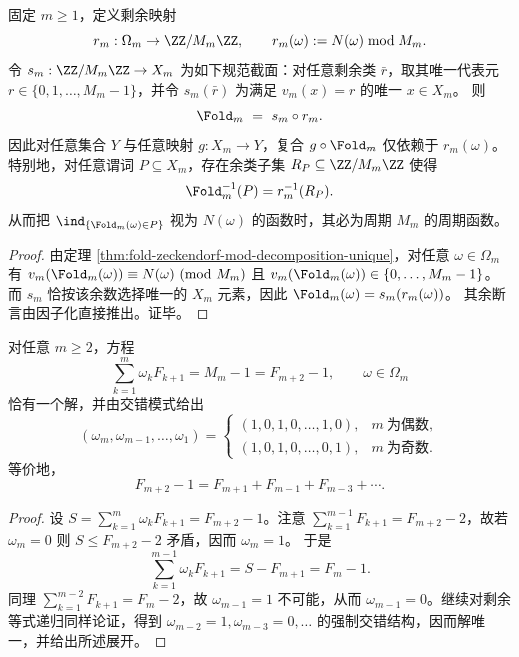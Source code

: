 \begin{corollary}[模余类刚性与有限分辨率谓词的周期性]\label{cor:fold-mod-rigidity-periodic-predicates}
固定 $m\ge 1$，定义剩余映射
\[
r_m:\Omega_m\to \ZZ/M_m\ZZ,\qquad r_m(\omega):=N(\omega)\bmod M_m.
\]
令 \(s_m:\ZZ/M_m\ZZ\to X_m\) 为如下规范截面：对任意剩余类 \(\bar r\)，取其唯一代表元 \(r\in\{0,1,\dots,M_m-1\}\)，并令 \(s_m(\bar r)\) 为满足 \(v_m(x)=r\) 的唯一 \(x\in X_m\)。
则
\[
\Fold_m\ =\ s_m\circ r_m.
\]
因此对任意集合 \(Y\) 与任意映射 \(g:X_m\to Y\)，复合 \(g\circ \Fold_m\) 仅依赖于 \(r_m(\omega)\)。
特别地，对任意谓词 \(P\subseteq X_m\)，存在余类子集 \(R_P\subseteq \ZZ/M_m\ZZ\) 使得
\[
\Fold_m^{-1}(P)=r_m^{-1}(R_P).
\]
从而把 \(\ind_{\{\Fold_m(\omega)\in P\}}\) 视为 \(N(\omega)\) 的函数时，其必为周期 \(M_m\) 的周期函数。
\end{corollary}

\begin{proof}
由定理 \ref{thm:fold-zeckendorf-mod-decomposition-unique}，对任意 \(\omega\in\Omega_m\) 有
\(
v_m(\Fold_m(\omega))\equiv N(\omega)\ (\mathrm{mod}\ M_m)
\)
且 \(v_m(\Fold_m(\omega))\in\{0,\dots,M_m-1\}\)。
而 \(s_m\) 恰按该余数选择唯一的 \(X_m\) 元素，因此 \(\Fold_m(\omega)=s_m(r_m(\omega))\)。
其余断言由因子化直接推出。证毕。
\end{proof}

\begin{proposition}[端点 $M_m-1$ 的子集和表示唯一性]\label{prop:fold-endpoint-Mm-minus-one-unique}
对任意 $m\ge 2$，方程
\[
\sum_{k=1}^{m}\omega_kF_{k+1}=M_m-1=F_{m+2}-1,\qquad \omega\in\Omega_m
\]
恰有一个解，并由交错模式给出
\[
(\omega_m,\omega_{m-1},\dots,\omega_1)=
\begin{cases}
(1,0,1,0,\dots,1,0), & m\ \text{为偶数},\\
(1,0,1,0,\dots,0,1), & m\ \text{为奇数}.
\end{cases}
\]
等价地，
\[
F_{m+2}-1=F_{m+1}+F_{m-1}+F_{m-3}+\cdots.
\]
\end{proposition}

\begin{proof}
设 $S=\sum_{k=1}^{m}\omega_kF_{k+1}=F_{m+2}-1$。注意 $\sum_{k=1}^{m-1}F_{k+1}=F_{m+2}-2$，故若 $\omega_m=0$ 则 $S\le F_{m+2}-2$ 矛盾，因而 $\omega_m=1$。
于是
\[
\sum_{k=1}^{m-1}\omega_kF_{k+1}=S-F_{m+1}=F_m-1.
\]
同理 $\sum_{k=1}^{m-2}F_{k+1}=F_m-2$，故 $\omega_{m-1}=1$ 不可能，从而 $\omega_{m-1}=0$。继续对剩余等式递归同样论证，得到 $\omega_{m-2}=1,\omega_{m-3}=0,\dots$ 的强制交错结构，因而解唯一，并给出所述展开。
\end{proof}


